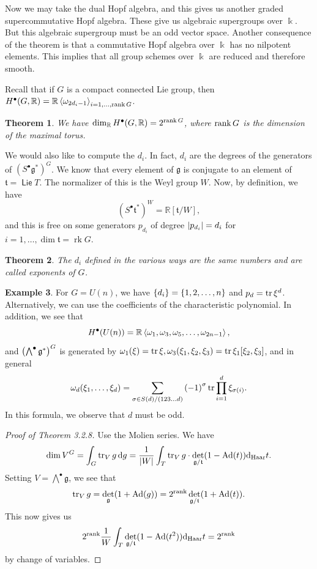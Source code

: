 \documentclass[leqno, openany]{memoir}
\newtheorem{thm}{Theorem}[section]
\theoremstyle{definition}
\newtheorem{exm}[thm]{Example}
\theoremstyle{remark}
\theoremstyle{plain}
\theoremstyle{definition}
\theoremstyle{remark}
\newcommand{\R}{\mathbb{R}}
\renewcommand{\k}{\Bbbk}
\newcommand{\mf}[1]{\mathfrak{#1}}
\newcommand{\mr}[1]{\mathrm{#1}}
\DeclareMathOperator{\Ad}{Ad}
\DeclareMathOperator{\Lie}{\mathsf{Lie}}
\DeclareMathOperator{\rk}{rk}
\begin{document}
Now we may take the dual Hopf algebra, and this gives us another graded
supercommutative Hopf algebra. These give us algebraic supergroups over $\k$.
But this algebraic supergroup must be an odd vector space. Another consequence
of the theorem is that a commutative Hopf algebra over $\k$ has no nilpotent
elements. This implies that all group schemes over $\k$ are reduced and
therefore smooth.

Recall that if $G$ is a compact connected Lie group, then $H^{\bullet}(G, \R) =
\R \ev{\omega_{2d_i - 1}}_{i = 1, \ldots, \rank G}$.

\begin{thm} We have $\dim_{\R} H^{\bullet}(G, \R) = 2^{\rank G}$, where $\rank
G$ is the dimension of the maximal torus.  \end{thm}

We would also like to compute the $d_i$. In fact, $d_i$ are the degrees of the
generators of ${ ( S^{\bullet} \mf{g}^* ) }^G$. We know that every element of
$\mf{g}$ is conjugate to an element of $\mf{t} = \Lie T$. The normalizer of
this is the Weyl group $W$. Now, by definition, we have \[ {(S^{\bullet}
\mf{t}^*)}^W = \R[\mf{t}/W], \] and this is free on some generators $p_{d_i}$
of degree $\abs{p_{d_i}} = d_i$ for $i = 1, \ldots, \dim \mf{t} = \rk G$.

\begin{thm} The $d_i$ defined in the various ways are the same numbers and are
called \textit{exponents} of $G$.  \end{thm}

\begin{exm} For $G = U(n)$, we have $\qty{d_i} = \qty{1, 2, \ldots, n}$ and
    $p_d = \tr \xi^d$. Alternatively, we can use the coefficients of the
    characteristic polynomial. In addition, we see that \[ H^{\bullet}(U(n)) =
    \R \ev{\omega_1, \omega_3, \omega_5, \ldots, \omega_{2n-1}}, \] and
    ${\qty(\bigwedge^{\bullet} \mf{g}^*)}^G$ is generated by $\omega_1(\xi) =
    \tr \xi, \omega_3 (\xi_1, \xi_2, \xi_3) = \tr \xi_1 [\xi_2, \xi_3]$, and in
    general \[ \omega_d(\xi_1, \ldots, \xi_d) = \sum_{\sigma \in S(d) /
    (123\ldots d)} {(-1)}^{\sigma} \tr \prod_{i=1}^d \xi_{\sigma(i)}. \] In
this formula, we observe that $d$ must be odd.  \end{exm}

\begin{proof}[Proof of Theorem 3.2.8] Use the Molien series. We have \[ \dim
V^G = \int_G \tr_V g \dd{g} = \frac{1}{\abs{W}} \int_T \tr_V g \cdot
\det_{\mf{g}/\mf{t}} (1 - \Ad(t)) \dd_{\mr{Haar}} t. \] Setting $V =
\bigwedge^{\bullet} \mf{g}$, we see that \[ \tr_V g = \det_{\mf{g}} (1 +
    \Ad(g)) = 2^{\rank} \det_{\mf{g}/\mf{t}} (1 + \Ad(t)). \] This now gives us
    \[ 2^{\rank} \frac{1}{W} \int_T \det_{\mf{g}/\mf{t}} (1 - \Ad(t^2))
    \dd_{\mr{Haar}} t = 2^{\rank} \] by change of variables.  \end{proof}
\end{document}
